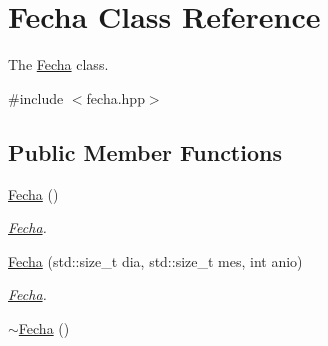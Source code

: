\hypertarget{classFecha}{}\section{Fecha Class Reference}
\label{classFecha}


The \hyperlink{classFecha}{Fecha} class.  




{\ttfamily \#include $<$fecha.\+hpp$>$}

\subsection*{Public Member Functions}
\begin{DoxyCompactItemize}
\item 
\hyperlink{classFecha_a5fbc6564d9c48e73cf8d27568a2a7fc5}{Fecha} ()
\begin{DoxyCompactList}\small\item\em \hyperlink{classFecha}{Fecha}. \end{DoxyCompactList}\item 
\hyperlink{classFecha_ac4e53e6fcbb50c3619cfc60e1a5de016}{Fecha} (std\+::size\+\_\+t dia, std\+::size\+\_\+t mes, int anio)
\begin{DoxyCompactList}\small\item\em \hyperlink{classFecha}{Fecha}. \end{DoxyCompactList}\item 
\hypertarget{classFecha_ae34f2ebe1ac7f3a78eefb68e8d1c8b86}{}\hyperlink{classFecha_ae34f2ebe1ac7f3a78eefb68e8d1c8b86}{$\sim$\+Fecha} ()\label{classFecha_ae34f2ebe1ac7f3a78eefb68e8d1c8b86}


\end{DoxyCompactItemize}
